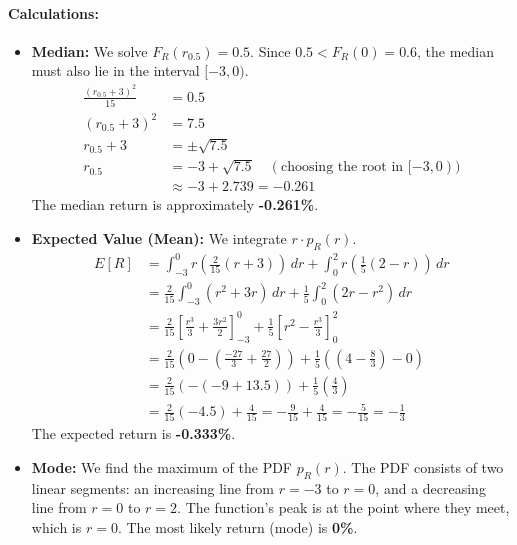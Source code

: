 \documentclass[11pt,a4paper]{article}
\begin{document}
\paragraph{Calculations:}
\begin{itemize}
    \item \textbf{Median:} We solve $F_R(r_{0.5}) = 0.5$. Since $0.5 < F_R(0)=0.6$, the median must also lie in the interval $[-3, 0)$.
    \begin{align*}
        \frac{(r_{0.5}+3)^2}{15} &= 0.5 \\
        (r_{0.5}+3)^2 &= 7.5 \\
        r_{0.5}+3 &= \pm\sqrt{7.5} \\
        r_{0.5} &= -3 + \sqrt{7.5} \quad (\text{choosing the root in } [-3, 0)) \\
        &\approx -3 + 2.739 = -0.261
    \end{align*}
    The median return is approximately \textbf{-0.261\%}.

    \item \textbf{Expected Value (Mean):} We integrate $r \cdot p_R(r)$.
    \begin{align*}
        E[R] &= \int_{-3}^{0} r \left(\frac{2}{15}(r+3)\right) \,dr + \int_{0}^{2} r \left(\frac{1}{5}(2-r)\right) \,dr \\
        &= \frac{2}{15}\int_{-3}^{0} (r^2+3r) \,dr + \frac{1}{5}\int_{0}^{2} (2r-r^2) \,dr \\
        &= \frac{2}{15}\left[\frac{r^3}{3} + \frac{3r^2}{2}\right]_{-3}^{0} + \frac{1}{5}\left[r^2 - \frac{r^3}{3}\right]_{0}^{2} \\
        &= \frac{2}{15}\left(0 - \left(\frac{-27}{3} + \frac{27}{2}\right)\right) + \frac{1}{5}\left(\left(4 - \frac{8}{3}\right) - 0\right) \\
        &= \frac{2}{15}\left(- \left(-9 + 13.5\right)\right) + \frac{1}{5}\left(\frac{4}{3}\right) \\
        &= \frac{2}{15}(-4.5) + \frac{4}{15} = -\frac{9}{15} + \frac{4}{15} = -\frac{5}{15} = -\frac{1}{3}
    \end{align*}
    The expected return is \textbf{-0.333\%}.

    \item \textbf{Mode:} We find the maximum of the PDF $p_R(r)$. The PDF consists of two linear segments: an increasing line from $r=-3$ to $r=0$, and a decreasing line from $r=0$ to $r=2$. The function's peak is at the point where they meet, which is $r=0$.
    The most likely return (mode) is \textbf{0\%}.
\end{itemize}
\end{document}
